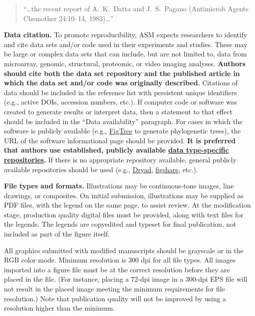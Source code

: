 \documentclass[lineno]{asm-article}
\begin{document}
\begin{quote}
``\ldots the  recent  report  of  A.~K.~Datta  and  J.~S.~Pagano
(Antimicrob Agents Chemother 24:10--14, 1983)\ldots''
\end{quote}

\textbf{Data citation.} 
To promote reproducibility, ASM expects researchers to identify and cite data sets and/or code used in their experiments and studies. These may be large or complex data sets that can include, but are not limited to, data from microarray, genomic, structural, proteomic, or video imaging analyses. \textbf{Authors should cite both the data set repository and the published article in which the data set and/or code was originally described.} Citations of data should be included in the reference list with persistent unique identifiers (e.g., active DOIs, accession numbers, etc.). If computer code or software was created to generate results or interpret data, then a statement to that effect should be included in the ``Data availability'' paragraph. For cases in which the software is publicly available (e.g., \href{http://tree.bio.ed.ac.uk/software/figtree/}{FigTree} to generate phylogenetic trees), the URL of the software informational page should be provided. \textbf{It is preferred that authors use established, publicly available \href{http://journals.asm.org/misc/Repositories.xhtml}{data type-specific repositories}.} If there is no appropriate repository available, general publicly available repositories should be used (e.g., \href{http://www.datadryad.org/}{Dryad}, \href{https://figshare.com/}{figshare}, etc.). 

\textbf{File types and formats.}
Illustrations may be continuous-tone images, line drawings, or composites. On initial submission, illustrations may be supplied as PDF files, with the legend on the same page, to assist review. At the modification stage, production quality digital files must be provided, along with text files for the legends. The legends are copyedited and typeset for final publication, not included as part of the figure itself.

All graphics submitted with modified manuscripts should be grayscale or in the RGB color mode. Minimum resolution is 300 dpi for all file types. All images imported into a figure file must be at the correct resolution before they are placed in the file. (For instance, placing a 72-dpi image in a 300-dpi EPS file will not result in the placed image meeting the minimum requirements for file resolution.) Note that publication quality will not be improved by using a resolution higher than the minimum.
\end{document}
